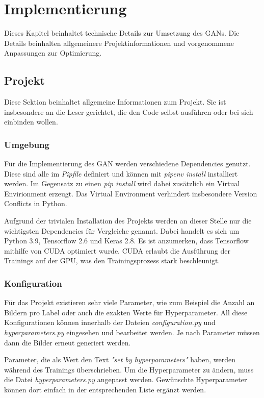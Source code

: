 
\chapter{Implementierung}
Dieses Kapitel beinhaltet technische Details zur Umsetzung des GANs.
Die Details beinhalten allgemeinere Projektinformationen und vorgenommene Anpassungen zur Optimierung.

\section{Projekt}
Diese Sektion beinhaltet allgemeine Informationen zum Projekt.
Sie ist insbesondere an die Leser gerichtet, die den Code selbst ausführen oder bei sich einbinden wollen.

\subsection{Umgebung}
Für die Implementierung des GAN werden verschiedene Dependencies genutzt.
Diese sind alle im \textit{Pipfile} definiert und können mit \textit{pipenv install} installiert werden.
Im Gegensatz zu einen \textit{pip install} wird dabei zusätzlich ein Virtual Envirionment erzeugt.
Das Virtual Environment verhindert insbesondere Version Conflicts in Python.
\newline

Aufgrund der trivialen Installation des Projekts werden an dieser Stelle nur die wichtigsten Dependencies für Vergleiche genannt.
Dabei handelt es sich um Python 3.9, Tensorflow 2.6 und Keras 2.8.
Es ist anzumerken, dass Tensorflow mithilfe von CUDA optimiert wurde.
CUDA erlaubt die Ausführung der Trainings auf der GPU, was den Trainingsprozess stark beschleunigt.

\subsection{Konfiguration}
Für das Projekt existieren sehr viele Parameter, wie zum Beispiel die Anzahl an Bildern pro Label oder auch die exakten Werte für Hyperparameter.
All diese Konfigurationen können innerhalb der Dateien \textit{configuration.py} und \textit{hyperparameters.py} eingesehen und bearbeitet werden.
Je nach Parameter müssen dann die Bilder erneut generiert werden.
\newline

Parameter, die als Wert den Text \textit{"set by hyperparameters"} haben, werden während des Trainings überschrieben.
Um die Hyperparameter zu ändern, muss die Datei \textit{hyperparameters.py} angepasst werden.
Gewünschte Hyperparameter können dort einfach in der entsprechenden Liste ergänzt werden.

